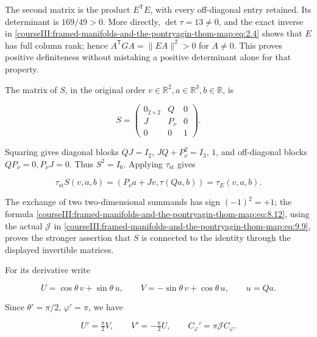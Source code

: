 The second matrix is the product \(E^{\mathsf T}E\), with every off-diagonal entry retained. Its determinant is \(169/49>0\). More directly, \(\det\tau=13\ne0\), and the exact inverse in \eqref{courseIII:framed-manifolds-and-the-pontryagin-thom-map:eq:2.4} shows that \(E\) has full column rank; hence \(A^{\mathsf T}GA=\|EA\|^2>0\) for \(A\ne0\). This proves positive definiteness without mistaking a positive determinant alone for that property.

The matrix of \(S\), in the original order \(v\in\mathbb R^2,a\in\mathbb R^3,b\in\mathbb R\), is

\begin{equation}
S=\begin{pmatrix}
 0_{2\times2}&Q&0\\
 J&P_\nu&0\\
 0&0&1
 \end{pmatrix}.
 \label{courseIII:framed-manifolds-and-the-pontryagin-thom-map:eq:9.12}
\end{equation}

Squaring gives diagonal blocks \(QJ=I_2\), \(JQ+P_\nu^2=I_3\), \(1\), and off-diagonal blocks \(QP_\nu=0,P_\nu J=0\). Thus \(S^2=I_6\). Applying \(\tau_{\mathrm{st}}\) gives

\begin{equation}
\tau_{\mathrm{st}}S(v,a,b)
       =(P_\nu a+Jv,\tau(Qa,b))=\tau_E(v,a,b).
 \label{courseIII:framed-manifolds-and-the-pontryagin-thom-map:eq:9.13}
\end{equation}

The exchange of two two-dimensional summands has sign \((-1)^2=+1\); the formula \eqref{courseIII:framed-manifolds-and-the-pontryagin-thom-map:eq:8.12}, using the actual \(\mathcal J\) in \eqref{courseIII:framed-manifolds-and-the-pontryagin-thom-map:eq:9.9}, proves the stronger assertion that \(S\) is connected to the identity through the displayed invertible matrices.

For its derivative write

\begin{equation}
U=\cos\theta\,v+\sin\theta\,u,\qquad
 V=-\sin\theta\,v+\cos\theta\,u,\qquad u=Qa.
 \label{courseIII:framed-manifolds-and-the-pontryagin-thom-map:eq:9.14}
\end{equation}

Since \(\theta'=\pi/2\), \(\varphi'=\pi\), we have

\begin{equation}
U'=\tfrac\pi2 V,\qquad V'=-\tfrac\pi2 U,\qquad
 C_\varphi'=\pi\mathcal J C_\varphi.
 \label{courseIII:framed-manifolds-and-the-pontryagin-thom-map:eq:9.15}
\end{equation}

